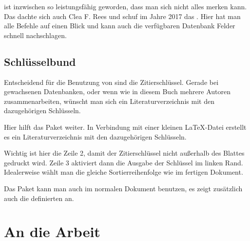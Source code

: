 \biblatex{} ist inzwischen so leistungsfähig geworden, dass man sich nicht alles merken kann.
Das dachte sich auch Clea F. Rees und schuf im Jahre 2017 das .
Hier hat man alle  Befehle auf einen Blick und kann auch die verfügbaren Datenbank Felder schnell nachschlagen.

\subsection{Schlüsselbund}

Entscheidend für die Benutzung von \biblatex{} sind die Zitierschlüssel.
Gerade bei gewachsenen Datenbanken,
oder wenn wie in diesem Buch mehrere Autoren zusammenarbeiten,
wünscht man sich ein Literaturverzeichnis mit den dazugehörigen Schlüsseln.

Hier hilft das Paket  weiter.
In Verbindung mit einer kleinen \LaTeX-Datei erstellt es ein Literaturverzeichnis mit den dazugehörigen Schlüsseln.


Wichtig ist hier die Zeile 2, damit der Zitierschlüssel nicht außerhalb des Blattes gedruckt wird.
Zeile 3 aktiviert dann die Ausgabe der Schlüssel im linken Rand.
Idealerweise wählt man die gleiche Sortierreihenfolge wie im fertigen Dokument.

Das Paket  kann man auch im normalen Dokument benutzen, 
es zeigt zusätzlich auch die definierten  an.

\section{An die Arbeit}

